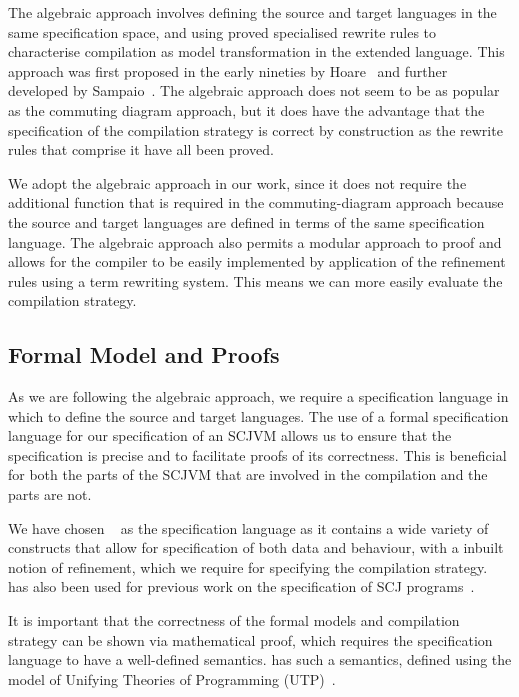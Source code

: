 The algebraic approach involves defining the source and target
languages in the same specification space, and using proved
specialised rewrite rules to characterise compilation as model
transformation in the extended language.
This approach was first proposed in the early nineties by
Hoare~\cite{hoare1991} and further developed by
Sampaio~\cite{hoare1993, sampaio1993}.
The algebraic approach does not seem to be as popular as the commuting
diagram approach, but it does have the advantage that the
specification of the compilation strategy is correct by construction
as the rewrite rules that comprise it have all been proved.

We adopt the algebraic approach in our work, since it does not require
the additional function that is required in the commuting-diagram
approach because the source and target languages are defined in terms
of the same specification language.
The algebraic approach also permits a modular approach to proof and
allows for the compiler to be easily implemented by application of the
refinement rules using a term rewriting system.
This means we can more easily evaluate the compilation strategy.

\subsection{Formal Model and Proofs}

As we are following the algebraic approach, we require a specification
language in which to define the source and target languages.
The use of a formal specification language for our specification of an
SCJVM allows us to ensure that the specification is precise and to
facilitate proofs of its correctness.
This is beneficial for both the parts of the SCJVM that are involved
in the compilation and the parts are not.

We have chosen \Circus{}~\cite{oliveira2009} as the specification
language as it contains a wide variety of
constructs that allow for specification of both data and behaviour,
with a inbuilt notion of refinement, which we require for specifying
the compilation strategy.
\Circus{} has also been used for previous work on the specification of
SCJ programs~\cite{cavalcanti2011, cavalcanti2013}.

It is important that the correctness of the formal models and
compilation strategy can be shown via mathematical proof, which
requires the specification language to have a well-defined semantics.
\Circus{} has such a semantics, defined using the model of Unifying
Theories of Programming (UTP)~\cite{hoare1998}.

